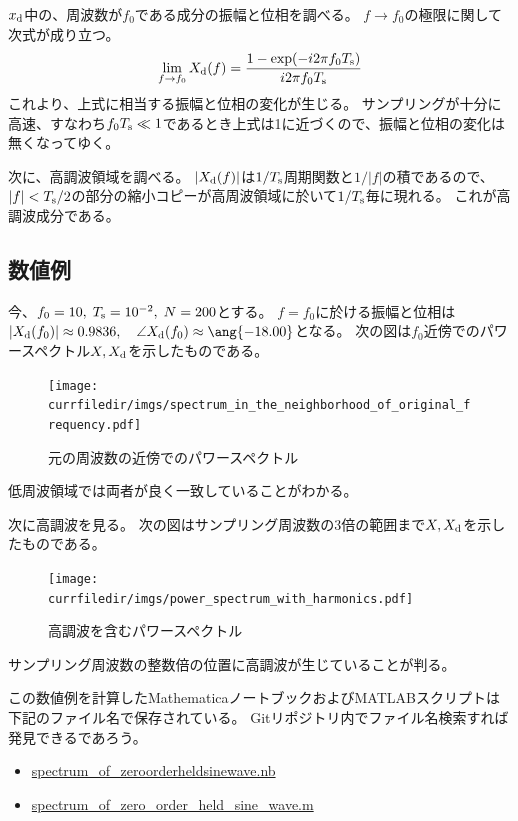             \par
            $x_\text{d}$中の、周波数が$f_0$である成分の振幅と位相を調べる。
            $f\to f_0$の極限に関して次式が成り立つ。
            \[ \lim_{f\to f_0} X_\text{d}(f) = \frac{1-\exp(-i 2\pi f_0T_\text{s})}{i 2\pi f_0T_\text{s}} \]
            これより、上式に相当する振幅と位相の変化が生じる。
            サンプリングが十分に高速、すなわち$f_0T_\text{s}\ll 1$であるとき上式は1に近づくので、振幅と位相の変化は無くなってゆく。
            \par
            次に、高調波領域を調べる。
            $|X_\text{d}(f)|$は$1/T_\text{s}$周期関数と$1/|f|$の積であるので、$|f|<T_\text{s}/2$の部分の縮小コピーが高周波領域に於いて$1/T_\text{s}$毎に現れる。
            これが高調波成分である。
        \subsection{数値例}
            今、$f_0=10,\;T_\text{s}=10^{-2},\;N=200$とする。
            $f=f_0$に於ける振幅と位相は$|\Xd(f_0)| \approx 0.9836,\quad \angle \Xd(f_0) \approx \ang{-18.00}$となる。
            次の図は$f_0$近傍でのパワースペクトル$X,X_\text{d}$を示したものである。
            \begin{figure}[H]
                \centering
                \texttt{[image: \\currfiledir/imgs/spectrum\_in\_the\_neighborhood\_of\_original\_frequency.pdf]}
                \caption{元の周波数の近傍でのパワースペクトル}
            \end{figure}
            低周波領域では両者が良く一致していることがわかる。
            \par
            次に高調波を見る。
            次の図はサンプリング周波数の3倍の範囲まで$X,X_\text{d}$を示したものである。
            \begin{figure}[H]
                \centering
                \texttt{[image: \\currfiledir/imgs/power\_spectrum\_with\_harmonics.pdf]}
                \caption{高調波を含むパワースペクトル}
            \end{figure}
            サンプリング周波数の整数倍の位置に高調波が生じていることが判る。
            \par
            この数値例を計算したMathematicaノートブックおよびMATLABスクリプトは下記のファイル名で保存されている。
            Gitリポジトリ内でファイル名検索すれば発見できるであろう。
            \begin{itemize}
                \item \href{\currfiledir/spectrum_of_zero-order-held-sine-wave.nb}{spectrum\_of\_zero\-order\-held\-sine\-wave.nb}
                \item \href{\currfiledir/spectrum_of_zero_order_held_sine_wave.m}{spectrum\_of\_zero\_order\_held\_sine\_wave.m}
            \end{itemize}
